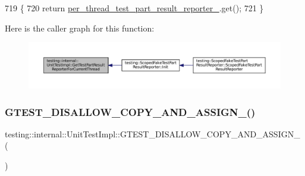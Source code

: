 \begin{DoxyCode}
719                                                         \{
720   \textcolor{keywordflow}{return} \hyperlink{classtesting_1_1internal_1_1UnitTestImpl_a23ebe35dfe19dcda8e7b17e81f2cb4bc}{per\_thread\_test\_part\_result\_reporter\_}.get();
721 \}
\end{DoxyCode}
Here is the caller graph for this function\+:
\nopagebreak
\begin{figure}[H]
\begin{center}
\leavevmode
\includegraphics[width=350pt]{classtesting_1_1internal_1_1UnitTestImpl_a5fb3dd8bc839e10b62eba07790704132_icgraph}
\end{center}
\end{figure}
\mbox{\label{classtesting_1_1internal_1_1UnitTestImpl_a9c8a7b2571705040ead6a61645278e18}} 
\subsubsection{\texorpdfstring{G\+T\+E\+S\+T\+\_\+\+D\+I\+S\+A\+L\+L\+O\+W\+\_\+\+C\+O\+P\+Y\+\_\+\+A\+N\+D\+\_\+\+A\+S\+S\+I\+G\+N\+\_\+()}{GTEST\_DISALLOW\_COPY\_AND\_ASSIGN\_()}}
{\footnotesize\ttfamily testing\+::internal\+::\+Unit\+Test\+Impl\+::\+G\+T\+E\+S\+T\+\_\+\+D\+I\+S\+A\+L\+L\+O\+W\+\_\+\+C\+O\+P\+Y\+\_\+\+A\+N\+D\+\_\+\+A\+S\+S\+I\+G\+N\+\_\+ (\begin{DoxyParamCaption}\item[{\hyperlink{classtesting_1_1internal_1_1UnitTestImpl}{Unit\+Test\+Impl}}]{ }\end{DoxyParamCaption})\hspace{0.3cm}{\ttfamily [private]}}

